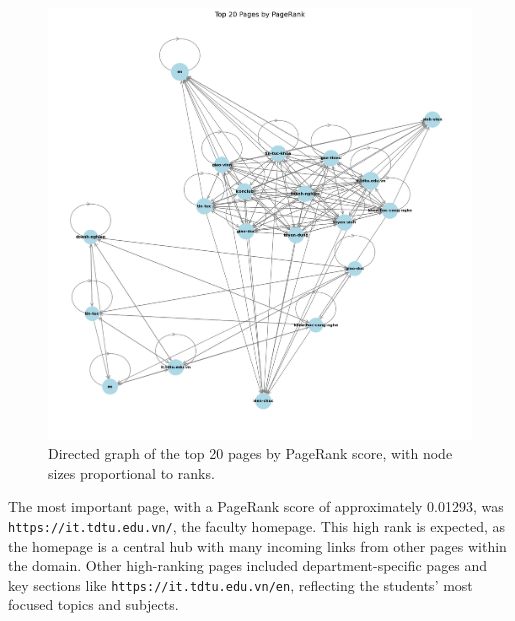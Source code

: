 \begin{figure}[H]
    \centering
    \includegraphics[width=0.6\linewidth]{images/top_pages_web}
    \caption{Directed graph of the top 20 pages by PageRank score, with node sizes proportional to ranks.}
    \label{fig:top_pages_graph}
\end{figure}

The most important page, with a PageRank score of approximately 0.01293, was \texttt{https://it.tdtu.edu.vn/}, the faculty homepage.
This high rank is expected, as the homepage is a central hub with many incoming links from other pages within the domain.
Other high-ranking pages included department-specific pages and key sections like \texttt{https://it.tdtu.edu.vn/en}, reflecting the students' most focused topics and subjects.